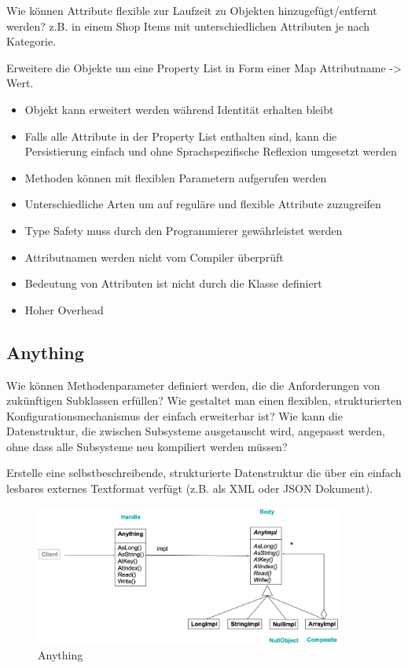 Wie können Attribute flexible zur Laufzeit zu Objekten hinzugefügt/entfernt werden? z.B. in einem Shop Items mit unterschiedlichen Attributen je nach Kategorie.

Erweitere die Objekte um eine Property List in Form einer Map Attributname -> Wert.

\begin{itemize}
	\item Objekt kann erweitert werden während Identität erhalten bleibt
	\item Falls alle Attribute in der Property List enthalten sind, kann die Persistierung einfach und ohne Sprachspezifische Reflexion umgesetzt werden
	\item Methoden können mit flexiblen Parametern aufgerufen werden
	\item Unterschiedliche Arten um auf reguläre und flexible Attribute zuzugreifen
	\item Type Safety muss durch den Programmierer gewährleistet werden
	\item Attributnamen werden nicht vom Compiler überprüft
	\item Bedeutung von Attributen ist nicht durch die Klasse definiert
	\item Hoher Overhead
\end{itemize}

\subsection{Anything}

Wie können Methodenparameter definiert werden, die die Anforderungen von zukünftigen Subklassen erfüllen? Wie gestaltet man einen flexiblen, strukturierten Konfigurationsmechanismus der einfach erweiterbar ist? Wie kann die Datenstruktur, die zwischen Subsysteme ausgetauscht wird, angepasst werden, ohne dass alle Subsysteme neu kompiliert werden müssen?

Erstelle eine selbstbeschreibende, strukturierte Datenstruktur die über ein einfach lesbares externes Textformat verfügt (z.B. als XML oder JSON Dokument).

\begin{figure}[H]
	\centering
	\includegraphics[width=0.9\textwidth]{content/advancedPatterns/anything.png}
	\caption{Anything}
\end{figure}

